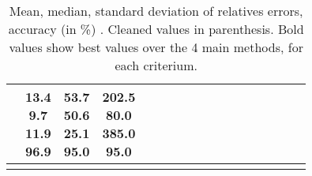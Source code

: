 \documentclass[9pt]{article}
\begin{document}
\begin{landscape}
\begin{longtable}{ l | c c c c | c c c c | c c c c | c c c c |}
             &
                            \makecell{              13.4
     \\
            {\footnotesize             9.7
    } \\  {\footnotesize             11.9
     } \\
            {\small \textcolor[rgb]{ 0.262 , 0.638 , 0.1} {96.9  }
} }
             &                         \makecell{              53.7
     \\
            {\footnotesize             50.6
    } \\  {\footnotesize             25.1
     } \\
            {\small \textcolor[rgb]{ 0.3 , 0.6 , 0.1} {95.0  }
} }
             &
                            \makecell{              202.5
     \\
            {\footnotesize             80.0
    } \\  {\footnotesize             385.0
     } \\
            {\small \textcolor[rgb]{ 0.3 , 0.6 , 0.1} {95.0  }
} }
            

 \\
                                                            \hline

                    \caption{Mean, median, standard deviation of relatives errors, accuracy (in \%) . Cleaned values in parenthesis.
                    Bold values show best values over the 4 main methods, for each criterium.}
                \end{longtable}
    \end{landscape}
\end{document}
